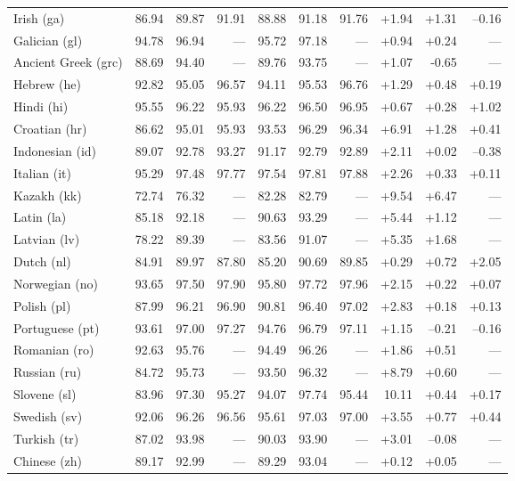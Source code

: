 \documentclass[11pt,a4paper]{article}
\begin{document}
\begin{table}[t]
\begin{tabular}{l|rrr|rrr|rrr}
Irish (ga) & 86.94 & 89.87 & 91.91 & 88.88 & 91.18 & 91.76 & +1.94 & +1.31 & --0.16\\
Galician (gl) & 94.78 & 96.94 & --- & 95.72 & 97.18 & --- & +0.94 & +0.24 & ---\\
Ancient Greek (grc) & 88.69 & 94.40 & --- & 89.76 & 93.75 & --- & +1.07 & -0.65 & ---\\
Hebrew (he) & 92.82 & 95.05 & 96.57 & 94.11 & 95.53 & 96.76 & +1.29 & +0.48 & +0.19\\
Hindi (hi) & 95.55 & 96.22 & 95.93 & 96.22 & 96.50 & 96.95 & +0.67 & +0.28 & +1.02\\
Croatian (hr) & 86.62 & 95.01 & 95.93 & 93.53 & 96.29 & 96.34 & +6.91 & +1.28 & +0.41\\
Indonesian (id) & 89.07 & 92.78 & 93.27 & 91.17 & 92.79 & 92.89 & +2.11 & +0.02 & --0.38\\
Italian (it) & 95.29 & 97.48 & 97.77 & 97.54 & 97.81 & 97.88 & +2.26 & +0.33 & +0.11\\
Kazakh (kk) & 72.74 & 76.32 & --- & 82.28 & 82.79 & --- & +9.54 & +6.47 & ---\\
Latin (la) & 85.18 & 92.18 & --- & 90.63 & 93.29 & --- & +5.44 & +1.12 & ---\\
Latvian (lv) & 78.22 & 89.39 & --- & 83.56 & 91.07 & --- & +5.35 & +1.68 & ---\\
Dutch (nl) & 84.91 & 89.97 & 87.80 & 85.20 & 90.69 & 89.85 & +0.29 & +0.72 & +2.05\\
Norwegian (no) & 93.65 & 97.50 & 97.90 & 95.80 & 97.72 & 97.96 & +2.15 & +0.22 & +0.07\\
Polish (pl) & 87.99 & 96.21 & 96.90 & 90.81 & 96.40 & 97.02 & +2.83 & +0.18 & +0.13\\
Portuguese (pt) & 93.61 & 97.00 & 97.27 & 94.76 & 96.79 & 97.11 & +1.15 & --0.21 & --0.16\\
Romanian (ro) & 92.63 & 95.76 & --- & 94.49 & 96.26 & --- & +1.86 & +0.51 & ---\\
Russian (ru) & 84.72 & 95.73 & --- & 93.50 & 96.32 & --- & +8.79 & +0.60 & ---\\
Slovene (sl) & 83.96 & 97.30 & 95.27 & 94.07 & 97.74 & 95.44 & 10.11 & +0.44 & +0.17\\
Swedish (sv) & 92.06 & 96.26 & 96.56 & 95.61 & 97.03 & 97.00 & +3.55 & +0.77 & +0.44\\
Turkish (tr) & 87.02 & 93.98 & --- & 90.03 & 93.90 & --- & +3.01 & --0.08 & ---\\
Chinese (zh) & 89.17 & 92.99 & --- & 89.29 & 93.04 & --- & +0.12 & +0.05 & ---\\

\end{tabular}
\end{table}
\end{document}
